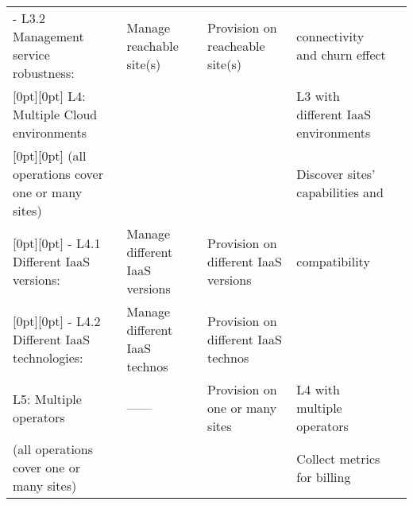 \begin{tabular}{@{} l L L L @{} >{\kern\tabcolsep}l @{}}
    - L3.2 Management service robustness:&
    Manage reachable site(s) &
    Provision on reacheable site(s)&
    connectivity and churn effect\\

    [0pt][0pt]
    L4: Multiple Cloud environments &
    &
    &
    L3 with different IaaS environments\\

    [0pt][0pt]
    (all operations cover one or many sites) &
    &
    &
    Discover sites' capabilities and\\

    [0pt][0pt]
    - L4.1 Different IaaS versions:&
    Manage different IaaS versions&
    Provision on different IaaS versions&
    compatibility\\
    
    [0pt][0pt]
    - L4.2 Different IaaS technologies:&
    Manage different IaaS technos&
    Provision on different IaaS technos&
    \\

    L5: Multiple operators &
    \hfill ------ \hfill &
    Provision on one or many sites&
    L4 with multiple operators\\ 

    (all operations cover one or many sites) &
    &
    &
    Collect metrics for billing\\
    \bottomrule

\end{tabular}

